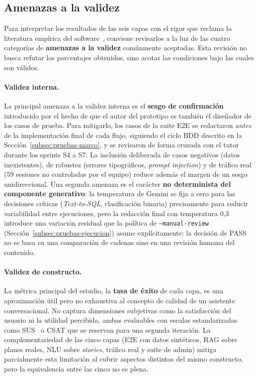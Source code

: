 \subsection{Amenazas a la validez}\label{subsec:pruebas-amenazas}

Para interpretar los resultados de las seis capas con el rigor que reclama la literatura empírica del software~\cite{wohlin2012experimentation}, conviene revisarlos a la luz de las cuatro categorías de \textbf{amenazas a la validez} comúnmente aceptadas. Esta revisión no busca refutar los porcentajes obtenidos, sino acotar las condiciones bajo las cuales son válidos.

\paragraph{Validez interna.} La principal amenaza a la validez interna es el \textbf{sesgo de confirmación} introducido por el hecho de que el autor del prototipo es también el diseñador de los casos de prueba. Para mitigarlo, los casos de la suite E2E se redactaron \textit{antes} de la implementación final de cada flujo, siguiendo el ciclo BDD descrito en la Sección~\ref{subsec:pruebas-marco}, y se revisaron de forma cruzada con el tutor durante los sprints S4 a S7. La inclusión deliberada de casos negativos (datos inexistentes), de robustez (errores tipográficos, \textit{prompt injection}) y de tráfico real (59 sesiones no controladas por el equipo) reduce además el margen de un sesgo unidireccional. Una segunda amenaza es el carácter \textbf{no determinista del componente generativo}: la temperatura de Gemini se fija a cero para las decisiones críticas (\textit{Text-to-SQL}, clasificación binaria) precisamente para reducir variabilidad entre ejecuciones, pero la redacción final con temperatura 0,3 introduce una variación residual que la política de \texttt{--manual-review} (Sección~\ref{subsec:pruebas-ejecucion}) asume explícitamente: la decisión de PASS no se basa en una comparación de cadenas sino en una revisión humana del contenido.

\paragraph{Validez de constructo.} La métrica principal del estudio, la \textbf{tasa de éxito} de cada capa, es una aproximación útil pero no exhaustiva al concepto de calidad de un asistente conversacional. No captura dimensiones subjetivas como la satisfacción del usuario ni la utilidad percibida, ambas evaluables con escalas estandarizadas como SUS~\cite{brooke1996sus} o CSAT que se reservan para una segunda iteración. La complementariedad de las cinco capas (E2E con datos sintéticos, RAG sobre planes reales, NLU sobre \textit{stories}, tráfico real y suite de admin) mitiga parcialmente esta limitación al cubrir aspectos distintos del mismo constructo, pero la equivalencia entre las cinco no es plena.

